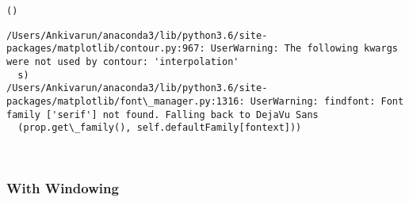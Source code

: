 \documentclass[11pt]{article}
\begin{document}
    \begin{Verbatim}[commandchars=\\\{\}]
()

    \end{Verbatim}

    \begin{Verbatim}[commandchars=\\\{\}]
/Users/Ankivarun/anaconda3/lib/python3.6/site-packages/matplotlib/contour.py:967: UserWarning: The following kwargs were not used by contour: 'interpolation'
  s)
/Users/Ankivarun/anaconda3/lib/python3.6/site-packages/matplotlib/font\_manager.py:1316: UserWarning: findfont: Font family ['serif'] not found. Falling back to DejaVu Sans
  (prop.get\_family(), self.defaultFamily[fontext]))

    \end{Verbatim}

    \begin{center}
    \end{center}
    { \hspace*{\fill} \\}
    
    \subsubsection{With Windowing}\label{with-windowing}
\end{document}
